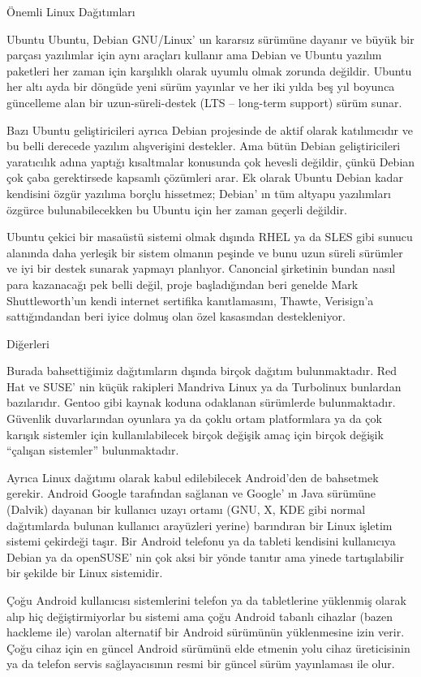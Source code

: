 \documentclass[10pt,a5paper]{book}
\begin{document}
\begin{section}{Önemli Linux Dağıtımları}
\begin{subsection}{Ubuntu}
Ubuntu, Debian GNU/Linux' un kararsız sürümüne dayanır ve büyük bir parçası yazılımlar için aynı araçları kullanır ama Debian ve Ubuntu yazılım paketleri her zaman için karşılıklı olarak uyumlu olmak zorunda değildir. Ubuntu her altı ayda bir döngüde yeni sürüm yayınlar ve her iki yılda beş yıl boyunca güncelleme alan bir uzun-süreli-destek (LTS – long-term support) sürüm sunar.

Bazı Ubuntu geliştiricileri ayrıca Debian projesinde de aktif olarak katılımcıdır ve bu belli derecede yazılım alışverişini destekler. Ama bütün Debian geliştiricileri yaratıcılık adına yaptığı kısaltmalar konusunda çok hevesli değildir, çünkü Debian çok çaba gerektirsede kapsamlı çözümleri arar. Ek olarak Ubuntu Debian kadar kendisini özgür yazılıma borçlu hissetmez; Debian' ın tüm altyapu yazılımları özgürce bulunabilecekken bu Ubuntu için her zaman geçerli değildir.

Ubuntu çekici bir masaüstü sistemi olmak dışında RHEL ya da SLES gibi sunucu alanında daha yerleşik bir sistem olmanın peşinde ve bunu uzun süreli sürümler ve iyi bir destek sunarak yapmayı planlıyor. Canoncial şirketinin bundan nasıl para kazanacağı pek belli değil, proje başladığından beri genelde Mark Shuttleworth'un kendi internet sertifika kanıtlamasını, Thawte, Verisign'a sattığındandan beri iyice dolmuş olan özel kasasından destekleniyor.

\end{subsection}
\begin{subsection}{Diğerleri}

Burada bahsettiğimiz dağıtımların dışında birçok dağıtım bulunmaktadır. Red Hat ve SUSE' nin küçük rakipleri Mandriva Linux ya da Turbolinux bunlardan bazılarıdır. Gentoo gibi kaynak koduna odaklanan sürümlerde bulunmaktadır. Güvenlik duvarlarından oyunlara ya da çoklu ortam platformlara ya da çok karışık sistemler için kullanılabilecek birçok değişik amaç için birçok değişik “çalışan sistemler” bulunmaktadır.

Ayrıca Linux dağıtımı olarak kabul edilebilecek Android'den de bahsetmek gerekir. Android Google tarafından sağlanan ve Google' ın Java sürümüne (Dalvik) dayanan bir kullanıcı uzayı ortamı (GNU, X, KDE gibi normal dağıtımlarda bulunan kullanıcı arayüzleri yerine) barındıran bir Linux işletim sistemi çekirdeği taşır. Bir Android telefonu ya da tableti kendisini kullanıcıya Debian ya da openSUSE' nin çok aksi bir yönde tanıtır ama yinede tartışılabilir bir şekilde bir Linux sistemidir.

Çoğu Android kullanıcısı sistemlerini telefon ya da tabletlerine yüklenmiş olarak alıp hiç değiştirmiyorlar bu sistemi ama çoğu Android tabanlı cihazlar (bazen hackleme ile) varolan alternatif bir Android sürümünün yüklenmesine izin verir. Çoğu cihaz için en güncel Android sürümünü elde etmenin yolu cihaz üreticisinin ya da telefon servis sağlayacısının resmi bir güncel sürüm yayınlaması ile olur.


\end{subsection}
\end{section}
\end{document}
